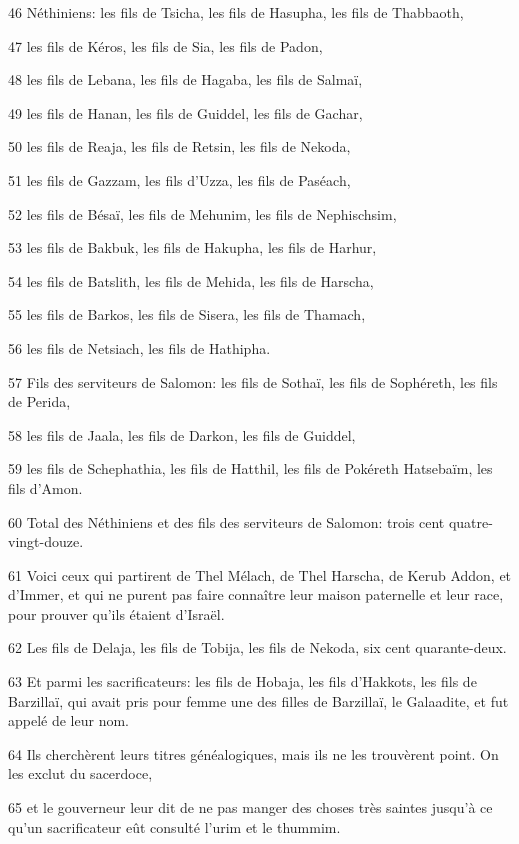 \par 46 Néthiniens: les fils de Tsicha, les fils de Hasupha, les fils de Thabbaoth,
\par 47 les fils de Kéros, les fils de Sia, les fils de Padon,
\par 48 les fils de Lebana, les fils de Hagaba, les fils de Salmaï,
\par 49 les fils de Hanan, les fils de Guiddel, les fils de Gachar,
\par 50 les fils de Reaja, les fils de Retsin, les fils de Nekoda,
\par 51 les fils de Gazzam, les fils d'Uzza, les fils de Paséach,
\par 52 les fils de Bésaï, les fils de Mehunim, les fils de Nephischsim,
\par 53 les fils de Bakbuk, les fils de Hakupha, les fils de Harhur,
\par 54 les fils de Batslith, les fils de Mehida, les fils de Harscha,
\par 55 les fils de Barkos, les fils de Sisera, les fils de Thamach,
\par 56 les fils de Netsiach, les fils de Hathipha.
\par 57 Fils des serviteurs de Salomon: les fils de Sothaï, les fils de Sophéreth, les fils de Perida,
\par 58 les fils de Jaala, les fils de Darkon, les fils de Guiddel,
\par 59 les fils de Schephathia, les fils de Hatthil, les fils de Pokéreth Hatsebaïm, les fils d'Amon.
\par 60 Total des Néthiniens et des fils des serviteurs de Salomon: trois cent quatre-vingt-douze.
\par 61 Voici ceux qui partirent de Thel Mélach, de Thel Harscha, de Kerub Addon, et d'Immer, et qui ne purent pas faire connaître leur maison paternelle et leur race, pour prouver qu'ils étaient d'Israël.
\par 62 Les fils de Delaja, les fils de Tobija, les fils de Nekoda, six cent quarante-deux.
\par 63 Et parmi les sacrificateurs: les fils de Hobaja, les fils d'Hakkots, les fils de Barzillaï, qui avait pris pour femme une des filles de Barzillaï, le Galaadite, et fut appelé de leur nom.
\par 64 Ils cherchèrent leurs titres généalogiques, mais ils ne les trouvèrent point. On les exclut du sacerdoce,
\par 65 et le gouverneur leur dit de ne pas manger des choses très saintes jusqu'à ce qu'un sacrificateur eût consulté l'urim et le thummim.
